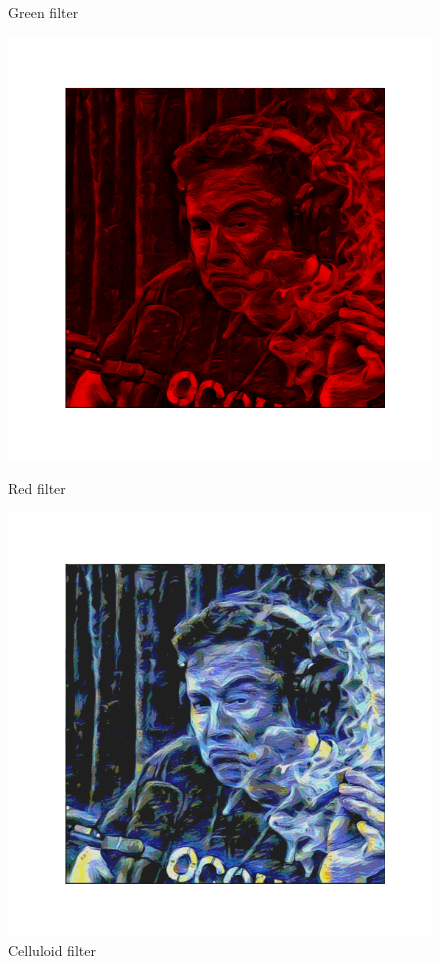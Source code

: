 \documentclass{42-en}
\begin{document}
\begin{figure}[h!]
\begin{minipage}[c]{0.49\linewidth}
    \vspace{-50pt}
    \caption{Green filter}
  \end{minipage}
  \vspace{-20pt}
  \begin{minipage}[l]{0.49\linewidth}
    \includegraphics[scale=0.38]{assets/elon_red.png}
    \vspace{-50pt}
    \caption{Red filter}
  \end{minipage}
  \hfill
  \begin{minipage}[c]{0.49\linewidth}
    \includegraphics[scale=0.38]{assets/elon_celluloid.png}
    \vspace{-50pt}
    \caption{Celluloid filter}
  \end{minipage}
  
\end{figure}
\end{document}
